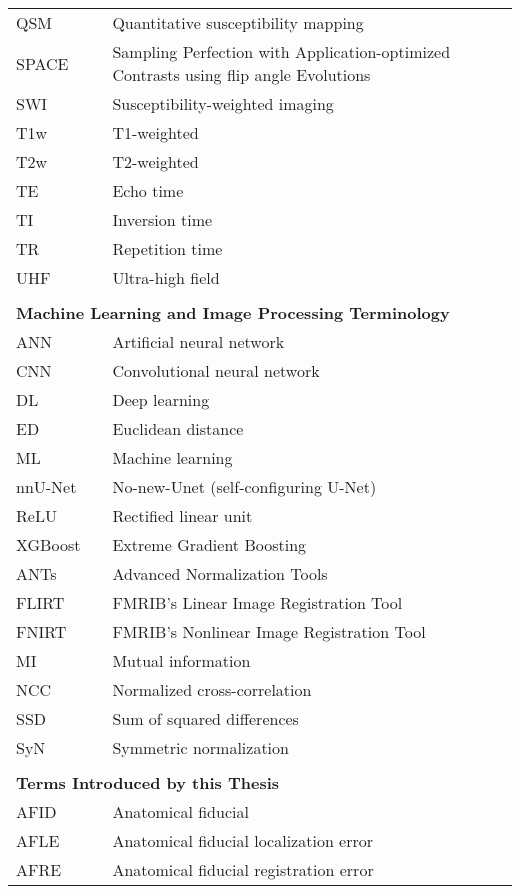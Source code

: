 \documentclass[hidelinks,12pt,oneside]{report}
\numberwithin{figure}{chapter}
\newenvironment{preliminary}%
{\pagestyle{plain}\pagenumbering{roman}}%
{\pagenumbering{arabic}}
\begin{document}
\begin{preliminary}
\begin{longtable}{lcl}
QSM & & Quantitative susceptibility mapping \\
SPACE & & Sampling Perfection with Application-optimized Contrasts using flip angle Evolutions \\
SWI & & Susceptibility-weighted imaging \\
T1w & & T1-weighted \\
T2w & & T2-weighted \\
TE & & Echo time \\
TI & & Inversion time \\
TR & & Repetition time \\
UHF & & Ultra-high field \\
\\
\multicolumn{3}{l}{\textbf{Machine Learning and Image Processing Terminology}} \\
ANN & & Artificial neural network \\
CNN & & Convolutional neural network \\
DL & & Deep learning \\
ED & & Euclidean distance \\
ML & & Machine learning \\
nnU-Net & & No-new-Unet (self-configuring U-Net) \\
ReLU & & Rectified linear unit \\
XGBoost & & Extreme Gradient Boosting \\
ANTs & & Advanced Normalization Tools \\
FLIRT & & FMRIB's Linear Image Registration Tool \\
FNIRT & & FMRIB's Nonlinear Image Registration Tool \\
MI & & Mutual information \\
NCC & & Normalized cross-correlation \\
SSD & & Sum of squared differences \\
SyN & & Symmetric normalization \\
\\
\multicolumn{3}{l}{\textbf{Terms Introduced by this Thesis}} \\
AFID & & Anatomical fiducial \\
AFLE & & Anatomical fiducial localization error \\
AFRE & & Anatomical fiducial registration error \\
\end{longtable}


\newpage
	
\clearpage


\end{preliminary}
\end{document}
